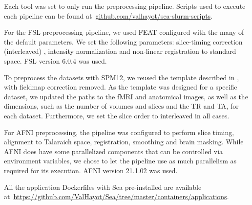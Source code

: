     Each tool was set to only run the preprocessing pipeline. Scripts used to
    execute each pipeline can be found
    at~\url{github.com/valhayot/sea-slurm-scripts}.
    
    For the FSL preprocessing pipeline, we used FEAT configured with the many of
    the default parameters. We set the following parameters: slice-timing
    correction (interleaved) , intensity normalization and non-linear
    registration to standard space. FSL version 6.0.4 was used.
    
    To preprocess the datasets with SPM12, we reused the template described in
    \cite{haitas2021age}, with fieldmap correction removed. As the template was
    designed for a specific dataset, we updated the paths to the fMRI and
    anatomical images, as well as the dimensions, such as the number of volumes
    and slices and the TR and TA, for each dataset. Furthermore, we set the
    slice order to interleaved in all cases. 
    
    For AFNI preprocessing, the pipeline was configured to perform slice timing,
    alignment to Talaraich space, registration, smoothing and brain masking.
    While AFNI does have some parallelized components that can be controlled via
    environment variables, we chose to let the pipeline use as much parallelism
    as required for its execution. AFNI version 21.1.02 was used.

    All the application Dockerfiles with Sea pre-installed are available
    at~\url{https://github.com/ValHayot/Sea/tree/master/containers/applications}.
    

    
